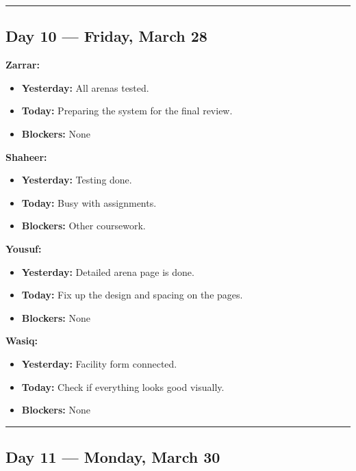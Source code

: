 \documentclass[12pt,a4paper]{article}
\begin{document}
\vspace{1em}
\hrule
\vspace{1em}

\subsection*{Day 10 --- Friday, March 28}

\textbf{Zarrar:}
\begin{itemize}[noitemsep]
    \item \textbf{Yesterday:} All arenas tested.
    \item \textbf{Today:} Preparing the system for the final review.
    \item \textbf{Blockers:} None
\end{itemize}

\textbf{Shaheer:}
\begin{itemize}[noitemsep]
    \item \textbf{Yesterday:} Testing done.
    \item \textbf{Today:} Busy with assignments.
    \item \textbf{Blockers:} Other coursework.
\end{itemize}

\textbf{Yousuf:}
\begin{itemize}[noitemsep]
    \item \textbf{Yesterday:} Detailed arena page is done.
    \item \textbf{Today:} Fix up the design and spacing on the pages.
    \item \textbf{Blockers:} None
\end{itemize}

\textbf{Wasiq:}
\begin{itemize}[noitemsep]
    \item \textbf{Yesterday:} Facility form connected.
    \item \textbf{Today:} Check if everything looks good visually.
    \item \textbf{Blockers:} None
\end{itemize}

\vspace{1em}
\hrule
\vspace{1em}

\subsection*{Day 11 --- Monday, March 30}
\end{document}
